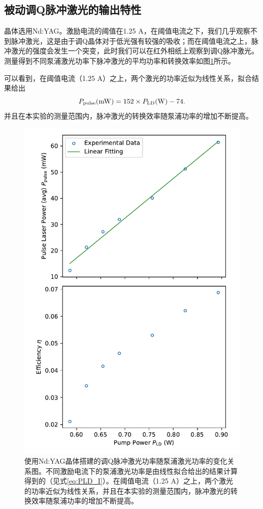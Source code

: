 \documentclass{mpltx}
\begin{document}
\subsection{被动调Q脉冲激光的输出特性}
晶体选用Nd:YAG。激励电流的阈值在1.25 A，在阈值电流之下，我们几乎观察不到脉冲激光，这是由于调Q晶体对于低光强有较强的吸收；而在阈值电流之上，脉冲激光的强度会发生一个突变，此时我们可以在红外相纸上观察到调Q脉冲激光。测量得到不同泵浦激光功率下脉冲激光的平均功率和转换效率如图\ref{fig:Ppulse_PLD}所示。

可以看到，在阈值电流（1.25 A）之上，两个激光的功率近似为线性关系，拟合结果给出
\begin{equation}
  P_{\rm pulse}({\rm mW})=152\times P_{\rm LD}({\rm W})-74.
\end{equation}并且在本实验的测量范围内，脉冲激光的转换效率随泵浦功率的增加不断提高。
\begin{figure}[h]
  \centering
  \includegraphics[width=0.6\linewidth]{fig/Ppulse_PLD.pdf}
  \caption{使用Nd:YAG晶体搭建的调Q脉冲激光功率随泵浦激光功率的变化关系图。不同激励电流下的泵浦激光功率是由线性拟合给出的结果计算得到的（见式\ref{eq:PLD_I}）。在阈值电流（1.25 A）之上，两个激光的功率近似为线性关系，并且在本实验的测量范围内，脉冲激光的转换效率随泵浦功率的增加不断提高。}
  \label{fig:Ppulse_PLD}
\end{figure}
\end{document}
